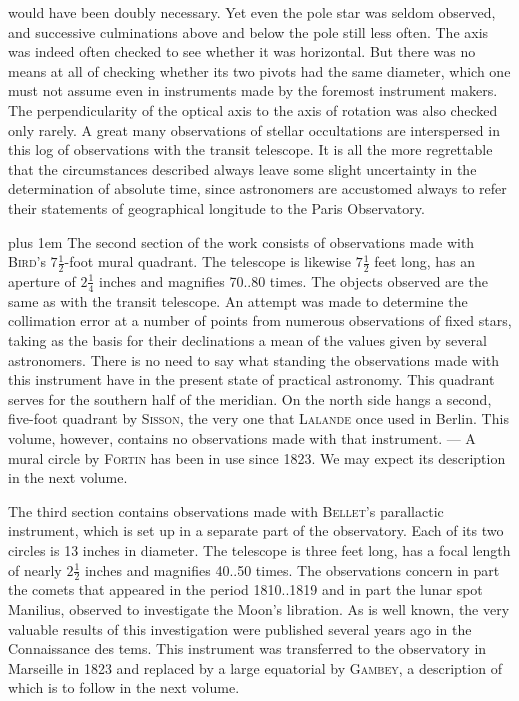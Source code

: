 would have been doubly necessary. Yet even the pole star was seldom observed, and successive culminations above and below the pole still less often. The axis was indeed often checked to see whether it was horizontal. But there was no means at all of checking whether its two pivots had the same diameter, which one must not assume even in instruments made by the foremost instrument makers. The perpendicularity of the optical axis to the axis of rotation was also checked only rarely. A great many observations of stellar occultations are interspersed in this log of observations with the transit telescope. It is all the more regrettable that the circumstances described always leave some slight uncertainty in the determination of absolute time, since astronomers are accustomed always to refer their statements of geographical longitude to the Paris Observatory.

\begingroup\rightskip=0pt plus 1em The second section of the work consists of observations made with \textsc{Bird}'s $7\frac{1}{2}$-foot mural quadrant. The telescope is likewise $7\frac{1}{2}$ feet long, has an aperture of $2\frac{1}{4}$ inches and magnifies 70..80 times. The objects observed are the same as with the transit telescope. An attempt was made to determine the collimation error at a number of points from numerous observations of fixed stars, taking as the basis for their declinations a mean of the values given by several astronomers. There is no need to say what standing the observations made with this instrument have in the present state of practical astronomy. This quadrant serves for the southern half of the meridian. On the north side hangs a second, five-foot quadrant by \textsc{Sisson}, the very one that \textsc{Lalande} once used in Berlin. This volume, however, contains no observations made with that instrument. --- A mural circle by \textsc{Fortin} has been in use since 1823. We may expect its description in the next volume.\par\endgroup

The third section contains observations made with \textsc{Bellet}'s parallactic instrument, which is set up in a separate part of the observatory. Each of its two circles is 13 inches in diameter. The telescope is three feet long, has a focal length of nearly $2\frac{1}{2}$ inches and magnifies 40..50 times. The observations concern in part the comets that appeared in the period 1810..1819 and in part the lunar spot Manilius, observed to investigate the Moon's libration. As is well known, the very valuable results of this investigation were published several years ago in the Connaissance des tems. This instrument was transferred to the observatory in Marseille in 1823 and replaced by a large equatorial by \textsc{Gambey}, a description of which is to follow in the next volume.
